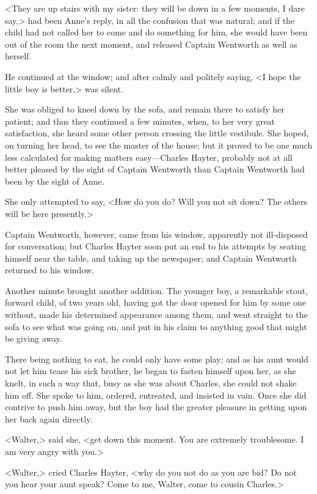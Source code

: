<They are up stairs with my sister: they will be down in a few moments, I dare say,> had been Anne's reply, in all the confusion that was natural; and if the child had not called her to come and do something for him, she would have been out of the room the next moment, and released Captain Wentworth as well as herself.

He continued at the window; and after calmly and politely saying, <I hope the little boy is better,> was silent.

She was obliged to kneel down by the sofa, and remain there to satisfy her patient; and thus they continued a few minutes, when, to her very great satisfaction, she heard some other person crossing the little vestibule. She hoped, on turning her head, to see the master of the house; but it proved to be one much less calculated for making matters easy—Charles Hayter, probably not at all better pleased by the sight of Captain Wentworth than Captain Wentworth had been by the sight of Anne.

She only attempted to say, <How do you do? Will you not sit down? The others will be here presently.>

Captain Wentworth, however, came from his window, apparently not ill-disposed for conversation; but Charles Hayter soon put an end to his attempts by seating himself near the table, and taking up the newspaper; and Captain Wentworth returned to his window.

Another minute brought another addition. The younger boy, a remarkable stout, forward child, of two years old, having got the door opened for him by some one without, made his determined appearance among them, and went straight to the sofa to see what was going on, and put in his claim to anything good that might be giving away.

There being nothing to eat, he could only have some play; and as his aunt would not let him tease his sick brother, he began to fasten himself upon her, as she knelt, in such a way that, busy as she was about Charles, she could not shake him off. She spoke to him, ordered, entreated, and insisted in vain. Once she did contrive to push him away, but the boy had the greater pleasure in getting upon her back again directly.

<Walter,> said she, <get down this moment. You are extremely troublesome. I am very angry with you.>

<Walter,> cried Charles Hayter, <why do you not do as you are bid? Do not you hear your aunt speak? Come to me, Walter, come to cousin Charles.>

